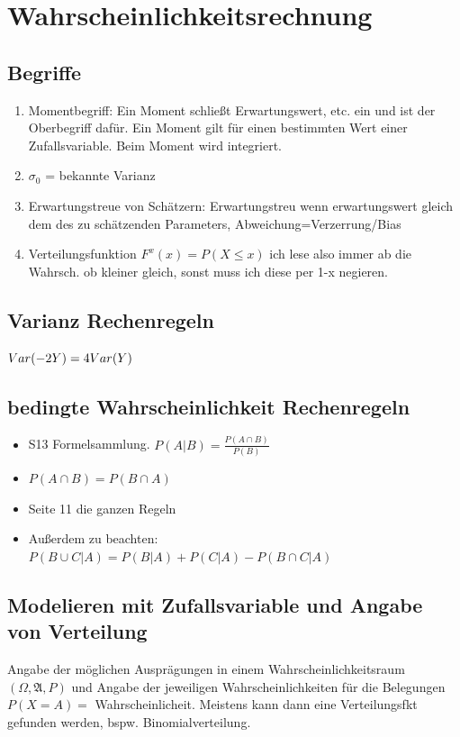 \documentclass[10pt,a4paper]{article}
\begin{document}
	\section{Wahrscheinlichkeitsrechnung}
	
	\subsection{Begriffe}
	\begin{enumerate}
		\item Momentbegriff: Ein Moment schließt Erwartungswert, etc. ein und ist der Oberbegriff dafür. Ein Moment gilt für einen bestimmten Wert einer Zufallsvariable. Beim Moment wird integriert.
		\item $\sigma_0$ = bekannte Varianz
		\item Erwartungstreue von Schätzern: Erwartungstreu wenn erwartungswert gleich dem des zu schätzenden Parameters, Abweichung=Verzerrung/Bias
		\item Verteilungsfunktion $F^x(x)=P(X\leq x)$ ich lese also immer ab die Wahrsch. ob kleiner gleich, sonst muss ich diese per 1-x negieren.
	\end{enumerate}
	\subsection{Varianz Rechenregeln}
	$Var(-2Y)=4\space Var(Y)$
	\subsection{bedingte Wahrscheinlichkeit Rechenregeln}
	\begin{itemize}
		\item S13 Formelsammlung. $P(A|B)=\frac{P(A\cap B)}{P(B)}$
		\item $P(A\cap B)=P(B\cap A)$
		\item Seite 11 die ganzen Regeln
		\item Außerdem zu beachten: ${P(B\cup C | A)} = P(B|A)+P(C|A) - P(B\cap C | A)$
	\end{itemize}
	\subsection{Modelieren mit Zufallsvariable und Angabe von Verteilung}
	Angabe der möglichen Ausprägungen in einem Wahrscheinlichkeitsraum $(\Omega,\mathfrak{A},P)$ und Angabe der jeweiligen Wahrscheinlichkeiten für die Belegungen $P(X=A)=$ Wahrscheinlicheit. Meistens kann dann eine Verteilungsfkt gefunden werden, bspw. Binomialverteilung.
\end{document}
